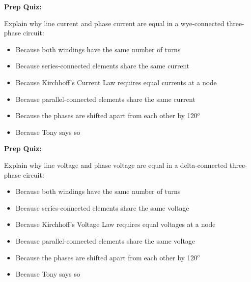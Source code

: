 









\vfil \eject

\noindent
{\bf Prep Quiz:}

Explain why line current and phase current are equal in a wye-connected three-phase circuit:

\begin{itemize}
\item{} Because both windings have the same number of turns
\vskip 5pt 
\item{} Because series-connected elements share the same current
\vskip 5pt 
\item{} Because Kirchhoff's Current Law requires equal currents at a node
\vskip 5pt 
\item{} Because parallel-connected elements share the same current
\vskip 5pt 
\item{} Because the phases are shifted apart from each other by 120$^{o}$
\vskip 5pt 
\item{} Because Tony says so
\end{itemize}










\vfil \eject

\noindent
{\bf Prep Quiz:}

Explain why line voltage and phase voltage are equal in a delta-connected three-phase circuit:

\begin{itemize}
\item{} Because both windings have the same number of turns
\vskip 5pt 
\item{} Because series-connected elements share the same voltage
\vskip 5pt 
\item{} Because Kirchhoff's Voltage Law requires equal voltages at a node
\vskip 5pt 
\item{} Because parallel-connected elements share the same voltage
\vskip 5pt 
\item{} Because the phases are shifted apart from each other by 120$^{o}$
\vskip 5pt 
\item{} Because Tony says so
\end{itemize}












